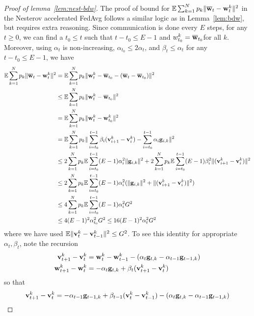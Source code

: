 \begin{proof}[Proof of lemma~\ref{lem:nest-bdw}]
	The proof of bound for $\mathbb{E}\sum_{k=1}^{N}p_{k}\|{\overline{\mathbf{w}}}_{t}-{\mathbf{w}}_{t}^{k}\|^{2}$ in the Nesterov accelerated FedAvg follows a similar logic as in Lemma~\ref{lem:bdw}, but requires extra reasoning.  
Since communication is done every $E$ steps, for any $t\geq0$, we
can find a $t_{0}\leq t$ such that $t-t_{0}\leq E-1$ and $w_{t_{0}}^{k}={\overline{\mathbf{w}}}_{t_{0}}$for
all $k$. Moreover, using $\alpha_{t}$ is non-increasing, $\alpha_{t_{0}}\leq2\alpha{}_{t}$,
and $\beta_{t}\leq\alpha_{t}$ for any $t-t_{0}\leq E-1$, we have
\begin{align*}
\mathbb{E}\sum_{k=1}^{N}p_{k}\|{\overline{\mathbf{w}}}_{t}-{\mathbf{w}}_{t}^{k}\|^{2} & =\mathbb{E}\sum_{k=1}^{N}p_{k}\|{\mathbf{w}}_{t}^{k}-{\overline{\mathbf{w}}}_{t_{0}}-({\overline{\mathbf{w}}}_{t}-{\overline{\mathbf{w}}}_{t_{0}})\|^{2}\\
& \leq\mathbb{E}\sum_{k=1}^{N}p_{k}\|{\mathbf{w}}_{t}^{k}-{\overline{\mathbf{w}}}_{t_{0}}\|^{2}\\
& =\mathbb{E}\sum_{k=1}^{N}p_{k}\|{\mathbf{w}}_{t}^{k}-{\mathbf{w}}_{t_{0}}^{k}\|^{2}\\
& =\mathbb{E}\sum_{k=1}^{N}p_{k}\|\sum_{i=t_{0}}^{t-1}\beta_{i}({\mathbf{v}}_{i+1}^{k}-{\mathbf{v}}_{i}^{k})-\sum_{i=t_{0}}^{t-1}\alpha_{i}{\mathbf{g}}_{i,k}\|^{2}\\
& \leq2\sum_{k=1}^{N}p_{k}\mathbb{E}\sum_{i=t_{0}}^{t-1}(E-1)\alpha_{i}^{2}\|{\mathbf{g}}_{i,k}\|^{2}+2\sum_{k=1}^{N}p_{k}\mathbb{E}\sum_{i=t_{0}}^{t-1}(E-1)\beta_{i}^{2}\|({\mathbf{v}}_{i+1}^{k}-{\mathbf{v}}_{i}^{k})\|^{2}\\
& \leq2\sum_{k=1}^{N}p_{k}\mathbb{E}\sum_{i=t_{0}}^{t-1}(E-1)\alpha_{i}^{2}(\|{\mathbf{g}}_{i,k}\|^{2}+\|({\mathbf{v}}_{i+1}^{k}-{\mathbf{v}}_{i}^{k})\|^{2})\\
& \leq4\sum_{k=1}^{N}p_{k}\mathbb{E}\sum_{i=t_{0}}^{t-1}(E-1)\alpha_{i}^{2}G^{2}\\
& \leq4(E-1)^{2}\alpha_{t_{0}}^{2}G^{2}\leq16(E-1)^{2}\alpha_{t}^{2}G^{2}
\end{align*}
where we have used $\mathbb{E}\|{\mathbf{v}}_{t}^{k}-{\mathbf{v}}_{t-1}^{k}\|^{2}\leq G^{2}$.
To see this identity for appropriate $\alpha_{t},\beta_{t}$, note
the recursion 
\begin{align*}
{\mathbf{v}}_{t+1}^{k}-{\mathbf{v}}_{t}^{k} & ={\mathbf{w}}_{t}^{k}-{\mathbf{w}}_{t-1}^{k}-(\alpha_{t}{\mathbf{g}}_{t,k}-\alpha_{t-1}{\mathbf{g}}_{t-1,k})\\
{\mathbf{w}}_{t+1}^{k}-{\mathbf{w}}_{t}^{k} & =-\alpha_{t}{\mathbf{g}}_{t,k}+\beta_{t}({\mathbf{v}}_{t+1}^{k}-{\mathbf{v}}_{t}^{k})
\end{align*}
so that 
\begin{align*}
\vv_{t+1}^{k}-\vv_{t}^{k} & =-\alpha_{t-1}\vg_{t-1,k}+\beta_{t-1}(\vv_{t}^{k}-\vv_{t-1}^{k})-(\alpha_{t}\vg_{t,k}-\alpha_{t-1}\vg_{t-1,k})\\

\end{align*}
\end{proof}
